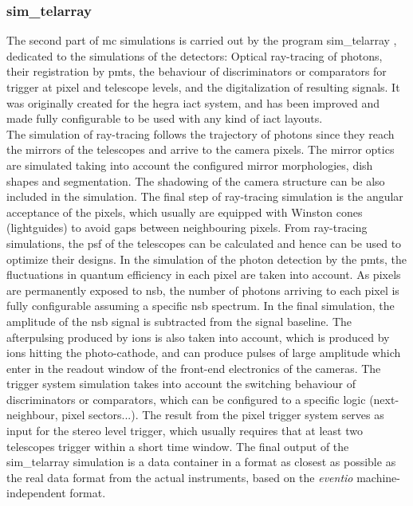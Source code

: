 \documentclass[main.tex]{subfiles}
\begin{document}
\subsubsection{sim\_telarray} \label{sec:simtel}

The second part of \gls{mc} simulations is carried out by the program sim\_telarray \cite{2008corsikanadsimtelarray}, dedicated to the simulations of the detectors: Optical ray-tracing of photons, their registration by \glspl{pmt}, the behaviour of discriminators or comparators for trigger at pixel and telescope levels, and the digitalization of resulting signals. It was originally created for the \gls{hegra} \gls{iact} system, and has been improved and made fully configurable to be used with any kind of \gls{iact} layouts.\\
The simulation of ray-tracing follows the trajectory of photons since they reach the mirrors of the telescopes and arrive to the camera pixels. The mirror optics are simulated taking into account the configured mirror morphologies, dish shapes and segmentation. The shadowing of the camera structure can be also included in the simulation. The final step of ray-tracing simulation is the angular acceptance of the pixels, which usually are equipped with Winston cones (lightguides) to avoid gaps between neighbouring pixels. From ray-tracing simulations, the \gls{psf} of the telescopes can be calculated and hence can be used to optimize their designs. In the simulation of the photon detection by the \glspl{pmt}, the fluctuations in quantum efficiency in each pixel are taken into account.  As pixels are permanently exposed to \gls{nsb}, the number of photons arriving to each pixel is fully configurable assuming a specific \gls{nsb} spectrum. In the final simulation, the amplitude of the \gls{nsb} signal is subtracted from the signal baseline. The afterpulsing produced by ions is also taken into account, which is produced by ions hitting the photo-cathode, and can produce pulses of large amplitude which enter in the readout window of the front-end electronics of the cameras. The trigger system simulation takes into account the switching behaviour of discriminators or comparators, which can be configured to a specific logic (next-neighbour, pixel sectors...). The result from the pixel trigger system serves as input for the stereo level trigger, which usually requires that at least two telescopes trigger within a short time window. The final output of the sim\_telarray simulation is a data container in a format as closest as possible as the real data format from the actual instruments, based on the \textit{eventio} machine-independent format.
\end{document}
